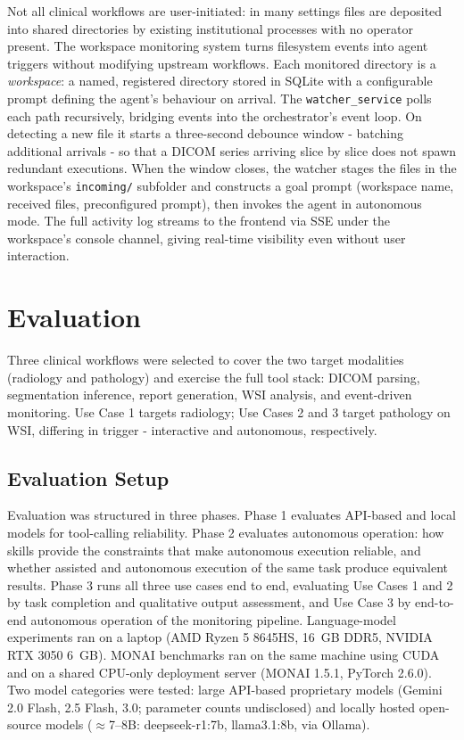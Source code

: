 \documentclass[conference]{IEEEtran}
\begin{document}
Not all clinical workflows are user-initiated: in many settings files are deposited into shared directories by existing institutional processes with no operator present. The workspace monitoring system turns filesystem events into agent triggers without modifying upstream workflows. Each monitored directory is a \textit{workspace}: a named, registered directory stored in SQLite with a configurable prompt defining the agent's behaviour on arrival. The \texttt{watcher\_service} polls each path recursively, bridging events into the orchestrator's event loop. On detecting a new file it starts a three-second debounce window - batching additional arrivals - so that a DICOM series arriving slice by slice does not spawn redundant executions. When the window closes, the watcher stages the files in the workspace's \texttt{incoming/} subfolder and constructs a goal prompt (workspace name, received files, preconfigured prompt), then invokes the agent in autonomous mode. The full activity log streams to the frontend via SSE under the workspace's console channel, giving real-time visibility even without user interaction.

\section{Evaluation}
\label{sec:evaluation}

Three clinical workflows were selected to cover the two target modalities (radiology and pathology) and exercise the full tool stack: DICOM parsing, segmentation inference, report generation, WSI analysis, and event-driven monitoring. Use Case 1 targets radiology; Use Cases 2 and 3 target pathology on WSI, differing in trigger - interactive and autonomous, respectively.

\subsection{Evaluation Setup}
Evaluation was structured in three phases. Phase 1 evaluates API-based and local models for tool-calling reliability. Phase 2 evaluates autonomous operation: how skills provide the constraints that make autonomous execution reliable, and whether assisted and autonomous execution of the same task produce equivalent results. Phase 3 runs all three use cases end to end, evaluating Use Cases 1 and 2 by task completion and qualitative output assessment, and Use Case 3 by end-to-end autonomous operation of the monitoring pipeline. Language-model experiments ran on a laptop (AMD Ryzen 5 8645HS, 16~GB DDR5, NVIDIA RTX 3050 6~GB). MONAI benchmarks ran on the same machine using CUDA and on a shared CPU-only deployment server (MONAI 1.5.1, PyTorch 2.6.0). Two model categories were tested: large API-based proprietary models (Gemini 2.0 Flash, 2.5 Flash, 3.0; parameter counts undisclosed) and locally hosted open-source models ($\approx$7--8B: deepseek-r1:7b, llama3.1:8b, via Ollama).
\end{document}
